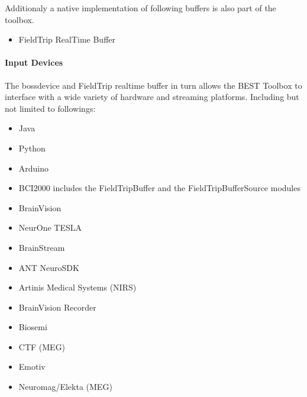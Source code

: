 \documentclass[letterpaper,10pt,english]{sphinxmanual}
\begin{document}
\sphinxAtStartPar
Additionaly a native implementation of following buffers is also part of the toolbox.
\begin{itemize}
\item {} 
\sphinxAtStartPar
FieldTrip Real\sphinxhyphen{}Time Buffer

\end{itemize}


\paragraph{Input Devices}
\label{\detokenize{1_Home:input-devices}}
\sphinxAtStartPar
The bossdevice and FieldTrip real\sphinxhyphen{}time buffer in turn allows the BEST Toolbox to interface with a wide variety of hardware and streaming platforms. Including but not limited to followings:
\begin{itemize}
\item {} 
\sphinxAtStartPar
Java

\item {} 
\sphinxAtStartPar
Python

\item {} 
\sphinxAtStartPar
Arduino

\item {} 
\sphinxAtStartPar
BCI2000 includes the FieldTripBuffer and the FieldTripBufferSource modules

\item {} 
\sphinxAtStartPar
BrainVision

\item {} 
\sphinxAtStartPar
NeurOne TESLA

\item {} 
\sphinxAtStartPar
BrainStream

\item {} 
\sphinxAtStartPar
ANT NeuroSDK

\item {} 
\sphinxAtStartPar
Artinis Medical Systems (NIRS)

\item {} 
\sphinxAtStartPar
BrainVision Recorder

\item {} 
\sphinxAtStartPar
Biosemi

\item {} 
\sphinxAtStartPar
CTF (MEG)

\item {} 
\sphinxAtStartPar
Emotiv

\item {} 
\sphinxAtStartPar
Neuromag/Elekta (MEG)


\end{itemize}
\end{document}
